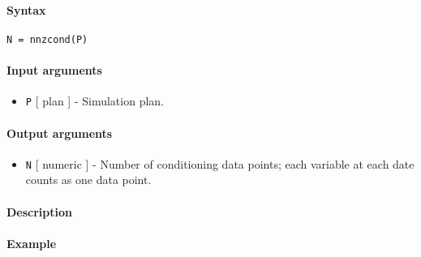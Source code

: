 


	\paragraph{Syntax}\label{syntax}

\begin{verbatim}
N = nnzcond(P)
\end{verbatim}

\paragraph{Input arguments}\label{input-arguments}

\begin{itemize}
\itemsep1pt\parskip0pt
\item
  \texttt{P} {[} plan {]} - Simulation plan.
\end{itemize}

\paragraph{Output arguments}\label{output-arguments}

\begin{itemize}
\itemsep1pt\parskip0pt
\item
  \texttt{N} {[} numeric {]} - Number of conditioning data points; each
  variable at each date counts as one data point.
\end{itemize}

\paragraph{Description}\label{description}

\paragraph{Example}\label{example}


